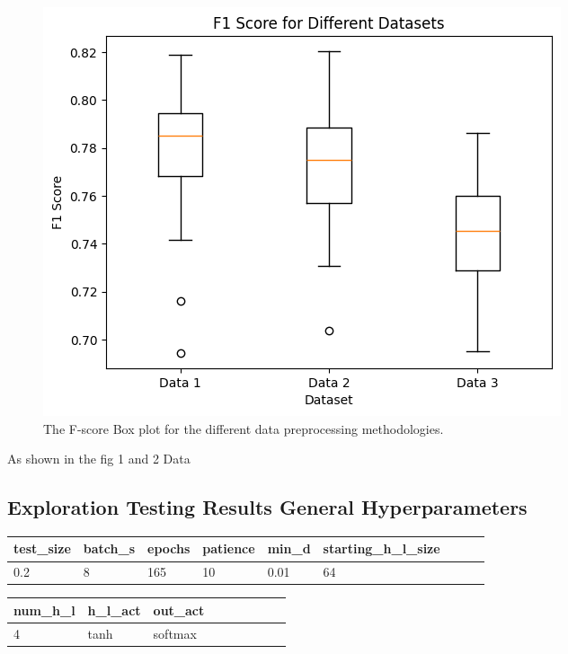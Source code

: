 \documentclass[conference]{IEEEtran}
\begin{document}
\begin{figure}[htbp]
\centerline{\includegraphics[width=\columnwidth]{Ex Per Data Pre Pros Box F1.png}}
\caption{The F-score Box plot for the different data preprocessing methodologies.}
\label{fig}
\end{figure}

As shown in the fig 1 and 2 Data

\subsection{Exploration Testing Results General Hyperparameters}

\begin{table}[!ht]
    \centering
    \begin{tabular}{|l|l|l|l|l|l|l|l|l|}
    \hline
        test\_size & batch\_s & epochs & patience & min\_d & starting\_h\_l\_size \\ \hline
        0.2 & 8 & 165 & 10 & 0.01 & 64 \\ \hline
    \end{tabular}
\end{table}

\begin{table}[!ht]
    \centering
    \begin{tabular}{|l|l|l|l|l|l|l|l|l|}
    \hline
        num\_h\_l & h\_l\_act & out\_act \\ \hline
        4 & tanh & softmax \\ \hline
    \end{tabular}
\end{table}
\end{document}
